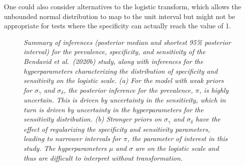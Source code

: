 \documentclass[11pt]{article}
\begin{document}
One could also consider alternatives to the logistic transform, which
allows the unbounded normal distribution to map to the unit interval
but might not be appropriate for tests where the specificity can
actually reach the value of 1.
%
\begin{figure}
\caption{\em Summary of inferences (posterior median and shortest 95\%
  posterior interval)  for the prevalence, specificity,
  and sensitivity of the Bendavid et al.\ (2020b) study, along
  with inferences for the hyperparameters characterizing the distribution of specificity
  and sensitivity on the logistic scale.  (a) For the model with weak
  priors for $\sigma_{\gamma}$ and $\sigma_{\delta}$, the posterior
  inference for the prevalence, $\pi$, is highly uncertain.  This is
  driven by uncertainty in the sensitivity, which in turn is driven
  by uncertainty in the hyperparameters for the sensitivity
  distribution. (b) Stronger priors on $\sigma_{\gamma}$ and
  $\sigma_{\delta}$ have the effect of regularizing the specificity
  and sensitivity parameters, leading to narrower intervals for $\pi$,
  the parameter of interest in this study.  The hyperparameters $\mu$
  and $\sigma$ are on the logistic scale and thus are difficult to
  interpret without transformation.}
\label{posterior2}
\end{figure}
\end{document}
